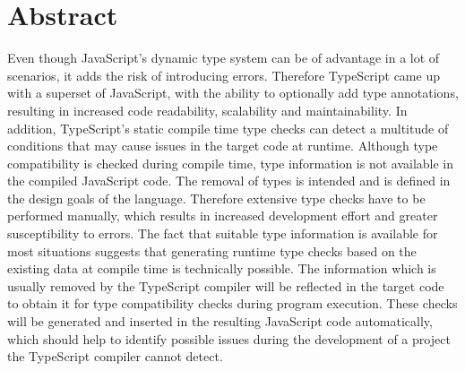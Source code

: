 \chapter{Abstract}


Even though JavaScript's dynamic type system can be of advantage in a lot of scenarios, it adds the risk of introducing errors. Therefore TypeScript came up with a superset of JavaScript, with the ability to optionally add type annotations, resulting in increased code readability, scalability and maintainability. In addition, TypeScript's static compile time type checks can detect a multitude of conditions that may cause issues in the target code at runtime. Although type compatibility is checked during compile time, type information is not available in the compiled JavaScript code. The removal of types is intended and is defined in the design goals of the language. Therefore extensive type checks have to be performed manually, which results in increased development effort and greater susceptibility to errors. The fact that suitable type information is available for most situations suggests that generating runtime type checks based on the existing data at compile time is technically possible. The information which is usually removed by the TypeScript compiler will be reflected in the target code to obtain it for type compatibility checks during program execution. These checks will be generated and inserted in the resulting JavaScript code automatically, which should help to identify possible issues during the development of a project the TypeScript compiler cannot detect.